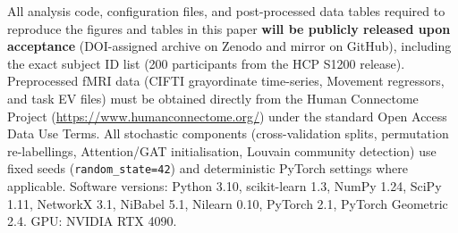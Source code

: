 \documentclass[conference]{IEEEtran}
\begin{document}
All analysis code, configuration files, and post-processed data tables required to reproduce the figures and tables in this paper \textbf{will be publicly released upon acceptance} (DOI-assigned archive on Zenodo and mirror on GitHub), including the exact subject ID list (200 participants from the HCP S1200 release). Preprocessed fMRI data (CIFTI grayordinate time-series, Movement regressors, and task EV files) must be obtained directly from the Human Connectome Project (\url{https://www.humanconnectome.org/}) under the standard Open Access Data Use Terms. All stochastic components (cross-validation splits, permutation re-labellings, Attention/GAT initialisation, Louvain community detection) use fixed seeds (\texttt{random\_state=42}) and deterministic PyTorch settings where applicable. Software versions: Python 3.10, scikit-learn 1.3, NumPy 1.24, SciPy 1.11, NetworkX 3.1, NiBabel 5.1, Nilearn 0.10, PyTorch 2.1, PyTorch Geometric 2.4. GPU: NVIDIA RTX 4090.
\end{document}
